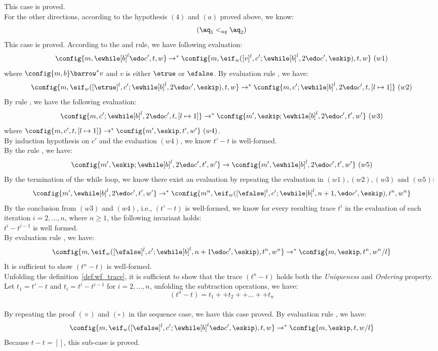 %
This case is proved.
%
\\
%
For the other directions, according to the hypothesis $(4)$ and $(a)$ proved above, we know:
\[
	(\aq_1 <_{aq} \aq_2)
\]
%
This case is proved.
%
%
According to the  and  rule, we have following evaluation:
\[
	\config{m, \ewhile [b]^l \edo c', t, w} \to^{*}
	\config{m, \eif_w([v]^l, c';\ewhile [b]^l, 2 \edo c', \eskip), t, w} ~ (w1)
\]
%
where $\config{m, b} \barrow^{*} v$ and $v$ is either $\etrue$ or $\efalse$.
%
%
By evaluation rule , we have:
%
\[
	\config{m, \eif_w([\etrue]^l, c';\ewhile [b]^l, 2 \edo c', \eskip), t, w} 
	\to^{*} \config{m, c';\ewhile [b]^l, 2 \edo c', t, [l \mapsto 1]} ~ (w2)
\]
%
By rule , we have the following evaluation:
%
\[
	\config{m, c';\ewhile [b]^l, 2 \edo c', t, [l \mapsto 1]} \to^{*} \config{m', \eskip;\ewhile [b]^l, 2 \edo c', t', w'} ~ (w3)
\] 
%
where $\config{m, c', t, [l \mapsto 1]} \to^{*} \config{m', \eskip, t', w'} ~ (w4)$. 
\\
%
By induction hypothesis on $c'$ and the evaluation $(w4)$, we know $t' - t$ is well-formed.
\\
By the rule , we have:
%
\[
	\config{m', \eskip;\ewhile [b]^l, 2 \edo c', t', w'} \to \config{m', \ewhile [b]^l, 2 \edo c', t', w'} ~ (w5)
\]
%
By the termination of the while loop, we know there exist an evaluation by repeating the evaluation in $(w1), (w2), (w3)$ and $(w5)$:
%
\[
	\config{m', \ewhile [b]^l, 2 \edo c', t', w'} \to^{*} \config{m^n, \eif_w([\efalse]^l, c';\ewhile [b]^l, n + 1, \edo c', \eskip), t^n, w^n}
\]
%
By the conclusion from $(w3)$ and $(w4)$, i.e., $(t' - t)$ is well-formed, 
we know for every resulting trace $t^i$ in the evaluation of each iteration $i = 2, \ldots, n$, where $n \geq 1$,
the following invariant holds:
\\
$t^i - t^{i - 1}$ is well formed.
\\
%
By evaluation rule , we have:
%
\[
	\config{m, \eif_w([\efalse]^l, c';\ewhile [b]^l, n + 1 \edo c', \eskip), t^n, w^n} 
	\to^{*} \config{m, \eskip, t^n, w^n/l}
\]
%
%
It is sufficient to show $(t^n - t)$ is well-formed.
\\
%
Unfolding the definition~\ref{def:wf_trace}, it is sufficient to show that the trace $(t^n - t)$ holds both the \emph{Uniqueness} and \emph{Ordering} property.
\\
Let $t_1 = t' - t$ and $t_i = t^{i} - t^{i - 1}$ for $i = 2, \ldots, n$, unfolding the subtraction operations, we have:
\[
	(t^n - t) = t_1 ++ t_2 ++ \ldots ++ t_n
\]
\\
By repeating the proof $(\diamond)$ and $(\square)$ in the sequence case, we have this case proved. 
%
%
By evaluation rule , we have:
%
\[
	\config{m, \eif_w([\efalse]^l, c';\ewhile [b]^l \edo c', \eskip), t, w} 
	\to^{*} \config{m, \eskip, t, w/l}
\]
%
%
Because $t - t = []$, this sub-case is proved.
%
